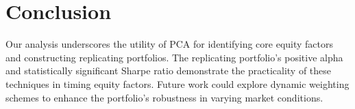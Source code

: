 \documentclass[
  a4paper]{article}
\begin{document}
\hypertarget{conclusion}{%
\section{Conclusion}\label{conclusion}}

Our analysis underscores the utility of PCA for identifying core equity
factors and constructing replicating portfolios. The replicating
portfolio's positive alpha and statistically significant Sharpe ratio
demonstrate the practicality of these techniques in timing equity
factors. Future work could explore dynamic weighting schemes to enhance
the portfolio's robustness in varying market conditions.
\end{document}
